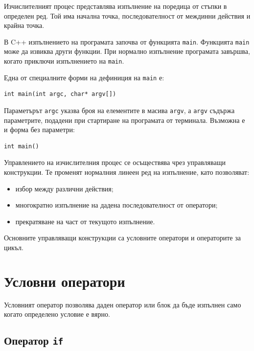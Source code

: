 \begin{defn}
Изчислителният процес представлява изпълнение на поредица от стъпки в определен ред. Той има начална точка, последователност от междинни действия и крайна точка.
\end{defn}

В C++ изпълнението на програмата започва от функцията \texttt{main}. Функцията \texttt{main} може да извиква други функции. При нормално изпълнение програмата завършва, когато приключи изпълнението на \texttt{main}.

Една от специалните форми на дефиниция на \texttt{main} е:

\begin{verbatim}
int main(int argc, char* argv[])
\end{verbatim}

Параметърът \texttt{argc} указва броя на елементите в масива \texttt{argv}, а \texttt{argv} съдържа параметрите, подадени при стартиране на програмата от терминала. Възможна е и форма без параметри:

\begin{verbatim}
int main()
\end{verbatim}

Управлението на изчислителния процес се осъществява чрез управляващи конструкции. Те променят нормалния линеен ред на изпълнение, като позволяват:

\begin{itemize}
\item избор между различни действия;
\item многократно изпълнение на дадена последователност от оператори;
\item прекратяване на част от текущото изпълнение.
\end{itemize}

Основните управляващи конструкции са условните оператори и операторите за цикъл.

\section{Условни оператори}\label{s:14.3}

Условният оператор позволява даден оператор или блок да бъде изпълнен само когато определено условие е вярно.

\subsection{Оператор \texttt{if}}\label{s:14.3.1}

